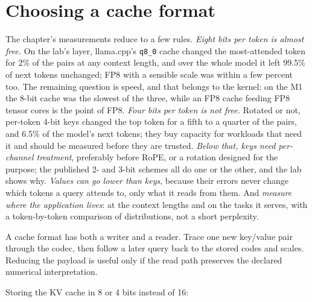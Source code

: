 \section{Choosing a cache format}

The chapter's measurements reduce to a few rules. \emph{Eight bits per token
is almost free.} On the lab's layer, llama.cpp's \texttt{q8\_0} cache changed the
most-attended token for 2\% of the pairs at any context length, and over the whole
model it left 99.5\% of next tokens unchanged; FP8 with a sensible scale was
within a few percent too. The remaining question is speed, and that belongs to
the kernel: on the M1 the 8-bit cache was the slowest of the three, while an
FP8 cache feeding FP8 tensor cores is the point of FP8. \emph{Four bits per token
is not free.} Rotated or not, per-token 4-bit keys changed the top token for a
fifth to a quarter of the pairs, and 6.5\% of the model's next tokens; they buy
capacity for workloads that need it and should be measured before they are
trusted. \emph{Below that, keys need per-channel treatment}, preferably before
RoPE, or a rotation designed for the purpose; the published 2- and 3-bit schemes
all do one or the other, and the lab shows why. \emph{Values can go lower than
keys}, because their errors never change which tokens a query attends to, only what it reads from them. And
\emph{measure where the application lives}: at the context lengths and on the
tasks it serves, with a token-by-token comparison of distributions, not a short
perplexity.

A cache format has both a writer and a reader. Trace one new key/value pair through the codec, then follow a later query back to the stored codes and scales. Reducing the payload is useful only if the read path preserves the declared numerical interpretation.


\LedgerSection

Storing the KV cache in 8 or 4 bits instead of 16:

